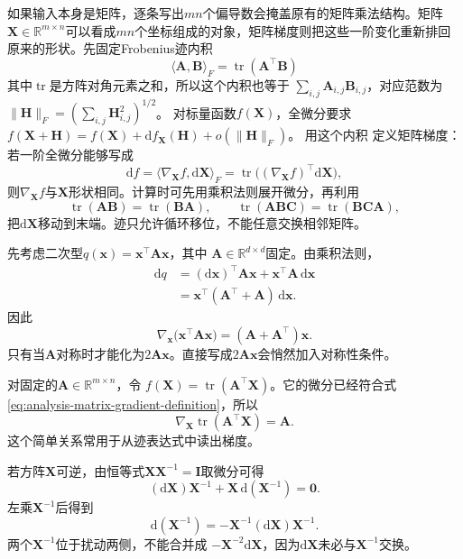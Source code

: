 如果输入本身是矩阵，逐条写出$mn$个偏导数会掩盖原有的矩阵乘法结构。矩阵$\bm{X}\in\mathbb{R}^{m\times n}$可以看成$mn$个坐标组成的对象，矩阵梯度则把这些一阶变化重新排回原来的形状。先固定Frobenius迹内积
\[   \langle\bm{A},\bm{B}\rangle_F   =   \operatorname{tr}(\bm{A}^{\top}\bm{B}) \]
其中$\operatorname{tr}$是方阵对角元素之和，所以这个内积也等于
$\sum_{i,j}\bm A_{i,j}\bm B_{i,j}$，对应范数为
$\lVert\bm H\rVert_F=(\sum_{i,j}\bm H_{i,j}^2)^{1/2}$。
对标量函数$f(\bm X)$，全微分要求
$f(\bm X+\bm H)=f(\bm X)+\mathrm df_{\bm X}(\bm H)+o(\lVert\bm H\rVert_F)$。
用这个内积
定义矩阵梯度：若一阶全微分能够写成
\begin{equation}
  \mathrm{d}f
  =
  \langle\nabla_{\bm{X}}f,\mathrm{d}\bm{X}\rangle_F
  =
  \operatorname{tr}\bigl((\nabla_{\bm{X}}f)^{\top}
  \mathrm{d}\bm{X}\bigr),
\label{eq:analysis-matrix-gradient-definition}
\end{equation}
则$\nabla_{\bm{X}}f$与$\bm{X}$形状相同。计算时可先用乘积法则展开微分，再利用
\[   \operatorname{tr}(\bm{A}\bm{B})   =\operatorname{tr}(\bm{B}\bm{A}),\qquad   \operatorname{tr}(\bm{A}\bm{B}\bm{C})   =\operatorname{tr}(\bm{B}\bm{C}\bm{A}), \]
把$\mathrm{d}\bm{X}$移动到末端。迹只允许循环移位，不能任意交换相邻矩阵。

先考虑二次型$q(\bm{x})=\bm{x}^{\top}\bm{A}\bm{x}$，其中 $\bm{A}\in\mathbb{R}^{d\times d}$固定。由乘积法则，
\begin{align*}
  \mathrm{d}q
  &=
  (\mathrm{d}\bm{x})^{\top}\bm{A}\bm{x}
  +\bm{x}^{\top}\bm{A}\,\mathrm{d}\bm{x}\\
  &=
  \bm{x}^{\top}(\bm{A}^{\top}+\bm{A})\,\mathrm{d}\bm{x}.
\end{align*}
因此
\begin{equation}
  \nabla_{\bm{x}}
  \bigl(\bm{x}^{\top}\bm{A}\bm{x}\bigr)
  =
  (\bm{A}+\bm{A}^{\top})\bm{x}.
\label{eq:analysis-quadratic-form-gradient}
\end{equation}
只有当$\bm{A}$对称时才能化为$2\bm{A}\bm{x}$。直接写成$2\bm{A}\bm{x}$会悄然加入对称性条件。

对固定的$\bm{A}\in\mathbb{R}^{m\times n}$，令 $f(\bm{X})=\operatorname{tr}(\bm{A}^{\top}\bm{X})$。它的微分已经符合式
\eqref{eq:analysis-matrix-gradient-definition}，所以
\begin{equation}
  \nabla_{\bm{X}}\operatorname{tr}(\bm{A}^{\top}\bm{X})
  =\bm{A}.
\label{eq:analysis-trace-linear-gradient}
\end{equation}
这个简单关系常用于从迹表达式中读出梯度。

若方阵$\bm{X}$可逆，由恒等式$\bm{X}\bm{X}^{-1}=\bm{I}$取微分可得
\[   (\mathrm{d}\bm{X})\bm{X}^{-1}   +\bm{X}\,\mathrm{d}(\bm{X}^{-1})=\bm{0}. \]
左乘$\bm{X}^{-1}$后得到
\begin{equation}
  \mathrm{d}(\bm{X}^{-1})
  =
  -\bm{X}^{-1}(\mathrm{d}\bm{X})\bm{X}^{-1}.
\label{eq:analysis-inverse-differential}
\end{equation}
两个$\bm{X}^{-1}$位于扰动两侧，不能合并成 $-\bm{X}^{-2}\mathrm{d}\bm{X}$，因为$\mathrm{d}\bm{X}$未必与$\bm{X}^{-1}$交换。


